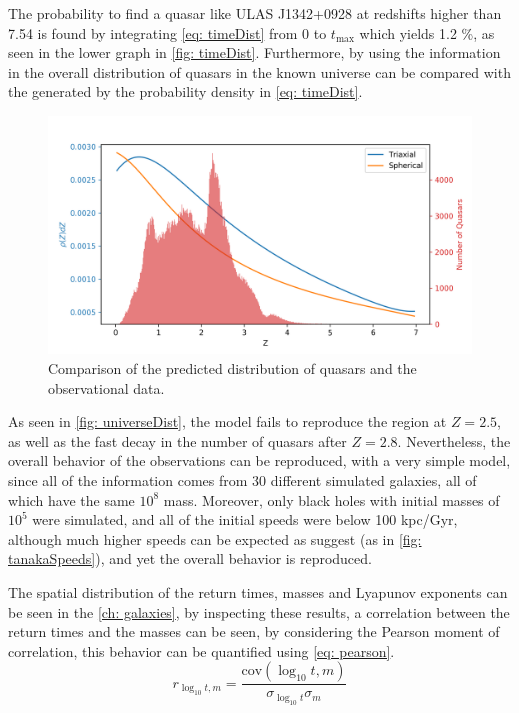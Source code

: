 	The probability to find a quasar like ULAS J1342+0928 at redshifts higher than 7.54 is found by integrating \autoref{eq: timeDist} from $0$ to $t_\text{max}$ which yields 1.2 \%, as seen in the lower graph in \autoref{fig: timeDist}. Furthermore, by using the information in  the overall distribution of quasars in the known universe can be compared with the generated by the probability density in \autoref{eq: timeDist}.
	\begin{figure}[h]
		\centering
		\includegraphics[width = 0.8\linewidth]{"../Files/Week 14/redshift_dist"}
		\caption{Comparison of the predicted distribution of quasars and the observational data.}
		\label{fig: universeDist}
	\end{figure}

	As seen in \autoref{fig: universeDist}, the model fails to reproduce the region at $Z = 2.5$, as well as the fast decay in the number of quasars after $Z = 2.8$. Nevertheless, the overall behavior of the observations can be reproduced, with a very simple model, since all of the information comes from 30 different simulated galaxies, all of which have the same $10^8$ \sm mass. Moreover, only black holes with initial masses of $10^5$ \sm were simulated, and all of the initial speeds were below 100 kpc/Gyr, although much higher speeds can be expected as \citeauthor{tanaka2009assembly} suggest (as in \autoref{fig: tanakaSpeeds}), and yet the overall behavior is reproduced.
	
	The spatial distribution of the return times, masses and Lyapunov exponents can be seen in the \autoref{ch: galaxies}, by inspecting these results, a correlation between the return times and the masses can be seen, by considering the Pearson moment of correlation, this behavior can be quantified using \autoref{eq: pearson}.
	\begin{equation}\label{eq: pearson}
		r_{\log_{10}t, m} = \dfrac{\text{cov}(\log_{10}t, m)}{\sigma_{\log_{10}t}\sigma_m}
	\end{equation}
	
